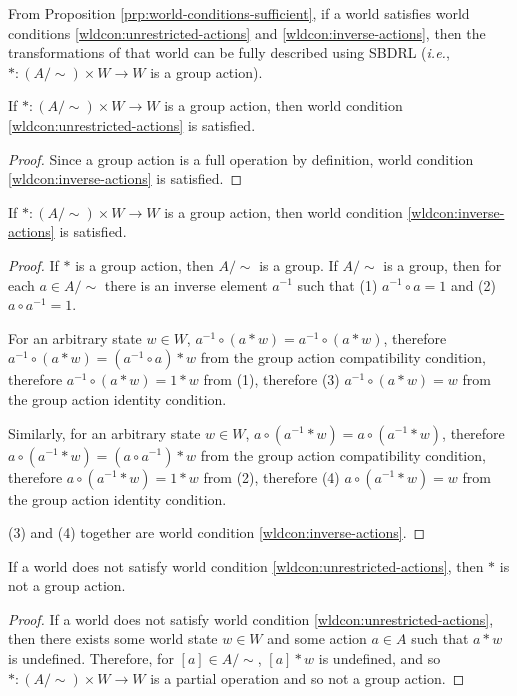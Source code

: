 From Proposition \ref{prp:world-conditions-sufficient}, if a world satisfies world conditions \ref{wldcon:unrestricted-actions} and \ref{wldcon:inverse-actions}, then the transformations of that world can be fully described using SBDRL (\textit{i.e.}, $*: (A/\sim) \times W \to W$ is a group action).

\begin{proposition}\label{prp:unrestricted-actions-necessary}
    If $*: (A/\sim) \times W \to W$ is a group action, then world condition \ref{wldcon:unrestricted-actions} is satisfied.
\end{proposition}
\begin{proof}
    Since a group action is a full operation by definition,  world condition \ref{wldcon:inverse-actions} is satisfied.
\end{proof}

\begin{proposition}\label{prp:inverse-actions-sufficient}
    If $*: (A/\sim) \times W \to W$ is a group action, then world condition \ref{wldcon:inverse-actions} is satisfied.
\end{proposition}
\begin{proof}
    If $*$ is a group action, 
    then $A/\sim$ is a group.
    If $A/\sim$ is a group, then for each $a \in A/\sim$ there is an inverse element $a^{-1}$ such that (1) $a^{-1} \circ a = 1$ and (2) $a \circ a^{-1} = 1$.

    For an arbitrary state $w \in W$, $a^{-1} \circ (a * w) = a^{-1} \circ (a * w)$, therefore $a^{-1} \circ (a * w) = (a^{-1} \circ a) * w$ from the group action compatibility condition, therefore  $a^{-1} \circ (a * w) = 1 * w$ from (1), therefore (3) $a^{-1} \circ (a * w) = w$ from the group action identity condition.

    Similarly, for an arbitrary state $w \in W$, $a \circ (a^{-1} * w) = a \circ (a^{-1} * w)$, therefore $a \circ (a^{-1} * w) = (a \circ a^{-1}) * w$ from the group action compatibility condition, therefore $a \circ (a^{-1} * w) = 1 * w$ from (2), therefore (4) $a \circ (a^{-1} * w) = w$ from the group action identity condition.

    (3) and (4) together are world condition \ref{wldcon:inverse-actions}.
\end{proof}


\begin{proposition}\label{prp:WC-unrestricted-actions-necessary}
    If a world does not satisfy world condition \ref{wldcon:unrestricted-actions}, then $*$ is not a group action.
\end{proposition}
\begin{proof}
    If a world does not satisfy world condition \ref{wldcon:unrestricted-actions}, then there exists some world state $w \in W$ and some action $a \in A$ such that $a * w$ is undefined.
    Therefore, for $[a] \in A/\sim$, $[a] * w$ is undefined, and so $*: (A/\sim) \times W \to W$ is a partial operation and so not a group action.
\end{proof}


